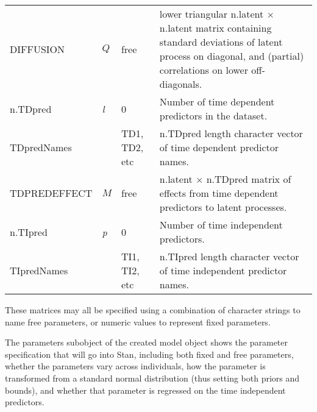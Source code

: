 \documentclass[nojss]{jss}\usepackage[]{graphicx}\usepackage[]{color}
\begin{document}
\begin{table}
\begin{tabular}{l|l|l p{8cm} }
 DIFFUSION & $Q$ & free & lower triangular n.latent $\times$ n.latent matrix containing standard deviations of latent process on diagonal, and (partial) correlations on lower off-diagonals.\\
 n.TDpred & \textit{l} & 0 & Number of time dependent predictors in the dataset.\\
 TDpredNames & & TD1, TD2, etc & n.TDpred length character vector of time dependent predictor names.\\
 TDPREDEFFECT & $M$ & free & n.latent $\times$ n.TDpred matrix of effects from time dependent predictors to latent processes.\\
 n.TIpred & \textit{p} & 0 & Number of time independent predictors.\\
 TIpredNames & & TI1, TI2, etc & n.TIpred length character vector of time independent predictor names.\\
\end{tabular}
\end{table}

These matrices may all be specified using a combination of character strings to name free parameters, or numeric values to represent fixed parameters. 

The parameters subobject of the created model object shows the parameter specification that will go into Stan, including both fixed and free parameters, whether the parameters vary across individuals, how the parameter is transformed from a standard normal distribution (thus setting both priors and bounds), and whether that parameter is regressed on the time independent predictors.
\end{document}
